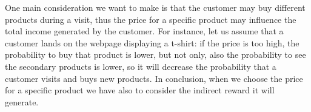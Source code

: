 One main consideration we want to make is that the customer may buy different products during a visit, thus the price for a specific product may influence the total income generated by the customer. For instance, let us assume that a customer lands on the webpage displaying a t-shirt: if the price is too high, the probability to buy that product is lower, but not only, also the probability to see the secondary products is lower, so it will decrease the probability that a customer visits and buys new products. In conclusion, when we choose the price for a specific product we have also to consider the indirect reward it will generate.